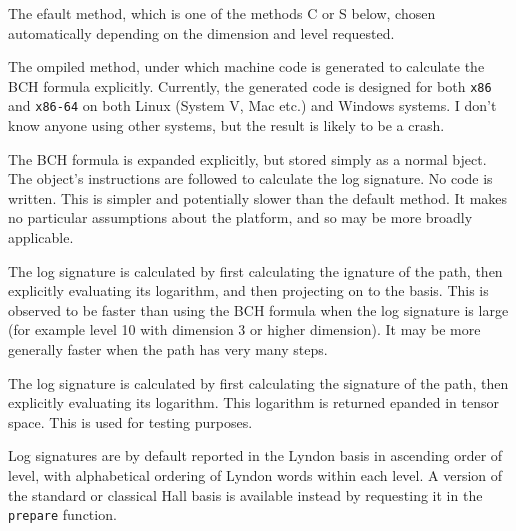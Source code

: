 \documentclass[a4paper]{extarticle}
\begin{document}
\begin{description}[leftmargin=1in,itemindent=0in,labelwidth=0.3in,
labelsep=0.3in,labelindent=0.4in]
\item[D] The efault method, which is one of the methods C or S below, chosen automatically depending on the dimension and level requested.
\item[C] The ompiled method, under which machine code is generated to calculate the BCH formula explicitly. Currently, the generated code is designed for both \verb|x86| and \verb|x86-64| on both Linux (System V, Mac etc.) and Windows systems. I don't know anyone using other systems, but the result is likely to be a crash.
\item[O] The BCH formula is expanded explicitly, but stored simply as a normal bject. The object's instructions are followed to calculate the log signature. No code is written. This is simpler and potentially slower than the default method. It makes no particular assumptions about the platform, and so may be more broadly applicable. 
\item[S] The log signature is calculated by first calculating the ignature of the path, then explicitly evaluating its logarithm, and then projecting on to the basis.%
This is observed to be faster than using the BCH formula when the log signature is large (for example level 10 with dimension 3 or higher dimension). It may be more generally faster when the path has very many steps.
\item[X] The log signature is calculated by first calculating the signature of the path, then explicitly evaluating its logarithm. This logarithm is returned epanded in tensor space. This is used for testing purposes.
\end{description}

Log signatures are by default reported in the Lyndon basis in ascending order of level, with alphabetical ordering of Lyndon words within each level. A version of the standard or classical Hall basis is available instead by requesting it in the \verb|prepare| function.
\end{document}
